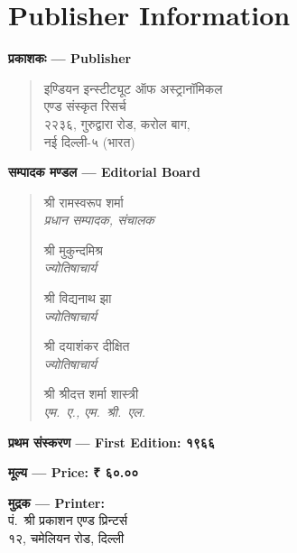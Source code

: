 \documentclass[11pt,a4paper]{article}
\newcommand{\dev}[1]{{\devanagarifont #1}}
\begin{document}
\newpage

\section*{Publisher Information}

\begin{center}
\textbf{\dev{प्रकाशकः --- Publisher}}
\end{center}

\begin{verse}
\dev{इण्डियन इन्स्टीट्यूट ऑफ अस्ट्रानॉमिकल}\\
\dev{एण्ड संस्कृत रिसर्च}\\
\dev{२२३६, गुरुद्वारा रोड, करोल बाग,}\\
\dev{नई दिल्ली-५ (भारत)}
\end{verse}

\begin{center}
\textbf{\dev{सम्पादक मण्डल --- Editorial Board}}
\end{center}

\begin{verse}
\dev{श्री रामस्वरूप शर्मा}\\
\hspace{2em}\textit{प्रधान सम्पादक, संचालक}

\dev{श्री मुकुन्दमिश्र}\\
\hspace{2em}\textit{ज्योतिषाचार्य}

\dev{श्री विद्यनाथ झा}\\
\hspace{2em}\textit{ज्योतिषाचार्य}

\dev{श्री दयाशंकर दीक्षित}\\
\hspace{2em}\textit{ज्योतिषाचार्य}

\dev{श्री श्रीदत्त शर्मा शास्त्री}\\
\hspace{2em}\textit{एम.\ ए., एम.\ श्री.\ एल.}
\end{verse}

\begin{center}
\textbf{\dev{प्रथम संस्करण --- First Edition: १९६६}}

\textbf{\dev{मूल्य --- Price: ₹ ६०.००}}

\textbf{\dev{मुद्रक --- Printer:}}\\
\dev{पं.\ श्री प्रकाशन एण्ड प्रिन्टर्स}\\
\dev{१२, चमेलियन रोड, दिल्ली}
\end{center}
\end{document}
